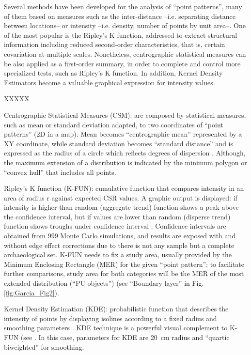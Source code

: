 Several methods have been developed for the analysis of “point patterns”, many of them based on measures such as the inter-distance –i.e. separating distance between locations– or intensity –i.e. density, number of points by unit area–. One of the most popular is the Ripley’s K function, addressed to extract structural information including reduced second-order characteristics, that is, certain covariation at multiple scales. Nonetheless, centrographic statistical measures can be also applied as a first-order summary, in order to complete and control more specialized tests, such as Ripley’s K function. In addition, Kernel Density Estimators become a valuable graphical expression for intensity values.

\begin{labeling}{XXXXX}
\item[Centrographic Statistical Measures (CSM):] are composed by statistical measures, such as mean or standard deviation adapted, to two coordinates of “point patterns” (2D in a map). Mean becomes “centrographic mean” represented by a XY coordinate, while standard deviation becomes “standard distance” and is expressed as the radius of a circle which reflects degrees of dispersion \parencites{Ebdon_1985}{Wong_2005}. Although, the maximum extension of a distribution is indicated by the minimum polygon or “convex hull” that includes all points.
	
\item[Ripley’s K function (K-FUN):] cumulative function that compares intensity in an area of radius r against expected CSR values. A graphic output is displayed: if intensity is higher than random (aggregate trend) function shows a peak above the confidence interval, but if values are lower than random (disperse trend) function shows troughs under confidence interval \parencites{Orton_2004}{Wong_2005}. Confidence intervals are obtained from 999 Monte Carlo simulations, and results are exposed with and without edge effect corrections due to there is not any sample but a complete archaeological set. K-FUN needs to fix a study area, usually provided by the Minimum Enclosing Rectangle (MER) for the given “point pattern”: to facilitate further comparisons, study area for both categories will be the MER of the most extended distribution (“PU objects”) (see “Boundary layer” in Fig. \ref{fig:Garcia_Fig2}).

\item[Kernel Density Estimation (KDE):] probabilistic function that describes the intensity of points by displaying isolines according to a fixed radius and smoothing parameters \parencite{Baxter_1997}. KDE technique is a powerful visual complement to K-FUN (see \parencite[see][]{Sayer_2013}. In this case, parameters for KDE are \SI{20}{\centi\meter} radius and “quartic biweighted” for smoothing.


\end{labeling}
